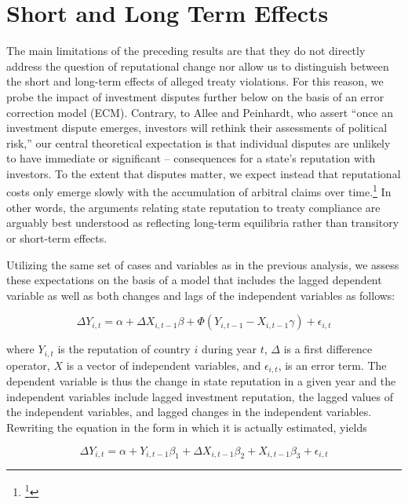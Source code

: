 \documentclass[12pt,onesided]{amsart}
\begin{document}
\section*{Short and Long Term Effects}

The main limitations of the preceding results are that they do not directly address the question of reputational change nor allow us to distinguish between the short and long-term effects of alleged treaty violations. For this reason, we probe the impact of investment disputes further below on the basis of an error correction model (ECM). Contrary, to Allee and Peinhardt, who assert ``once an investment dispute emerges, investors will rethink their assessments of political risk,'' our central theoretical expectation is that individual disputes are unlikely to have immediate or significant -- consequences for a state's reputation with investors. To the extent that disputes matter, we expect instead that reputational costs only emerge slowly with the accumulation of arbitral claims over time.\footnote{\footnote{\citet[p. 402]{allee:peinhardt:2011}}} In other words, the arguments relating state reputation to treaty compliance are arguably best understood as reflecting long-term equilibria rather than transitory or short-term effects.

Utilizing the same set of cases and variables as in the previous analysis, we assess these expectations on the basis of a model that includes the lagged dependent variable as well as both changes and lags of the independent variables as follows:

\begin{equation}
\Delta Y_{i,t} = \alpha + \Delta X_{i,t-1} \beta + \Phi(Y_{i,t-1} - X_{i,t-1} \gamma) + \epsilon_{i,t}
\end{equation}

where $Y_{i,t}$ is the reputation of country $i$ during year $t$, $\Delta$ is a first difference operator, $X$ is a vector of independent variables, and $\epsilon_{i,t}$, is an error term. The dependent variable is thus the change in state reputation in a given year and the independent variables include lagged investment reputation, the lagged values of the independent variables, and lagged changes in the independent variables. Rewriting the equation in the form in which it is actually estimated, yields

\begin{equation}
\Delta Y_{i,t} = \alpha + Y_{i,t-1} \beta_{1} + \Delta X_{i,t-1} \beta_{2} + X_{i, t-1} \beta_{3} + \epsilon_{i,t}
\end{equation}
\end{document}
